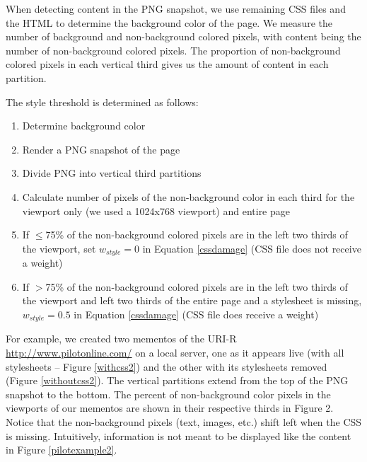When detecting content in the PNG snapshot, we use remaining CSS files and the HTML to determine the background color of the page. We measure the number of background and non-background colored pixels, with content being the number of non-background colored pixels. The proportion of non-background colored pixels in each vertical third gives us the amount of content in each partition.

The style threshold is determined as follows:

\begin{enumerate}
  \item Determine background color
  \item Render a PNG snapshot of the page
  \item Divide PNG into vertical third partitions
  \item Calculate number of pixels of the non-background color in each third for the viewport only (we used a 1024x768 viewport) and entire page
  \item If $\le$75\% of the non-background colored pixels are in the left two thirds of the viewport, set \emph{$w_{style}=0$} in Equation \ref{cssdamage} (CSS file does not receive a weight)
  \item If $>$75\% of the non-background colored pixels are in the left two thirds of the viewport and left two thirds of the entire page and a stylesheet is missing, \emph{$w_{style}=0.5$} in Equation \ref{cssdamage} (CSS file does receive a weight)
\end{enumerate}

For example, we created two mementos of the URI-R \url{http://www.pilotonline.com/} on a local server, one as it appears live (with all stylesheets -- Figure \ref{withcss2}) and the other with its stylesheets removed (Figure \ref{withoutcss2}). The vertical partitions extend from the top of the PNG snapshot to the bottom.
 The percent of non-background color pixels in the viewports of our mementos are shown in their respective thirds in Figure 2. Notice that the non-background pixels (text, images, etc.) shift left when the CSS is missing. Intuitively, information is not meant to be displayed like the content in Figure \ref{pilotexample2}.

